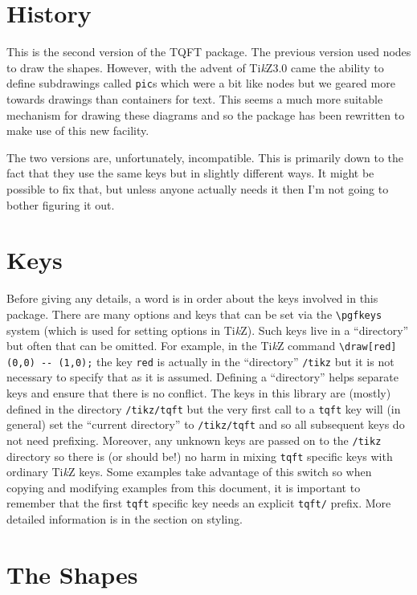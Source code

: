 \documentclass{ltxdoc}
\begin{document}
\section{History}

This is the second version of the TQFT package.
The previous version used nodes to draw the shapes.
However, with the advent of Ti\emph{k}Z3.0 came the ability to define subdrawings called \Verb+pic+s which were a bit like nodes but we geared more towards drawings than containers for text.
This seems a much more suitable mechanism for drawing these diagrams and so the package has been rewritten to make use of this new facility.

The two versions are, unfortunately, incompatible.
This is primarily down to the fact that they use the same keys but in slightly different ways.
It might be possible to fix that, but unless anyone actually needs it then I'm not going to bother figuring it out.


\section{Keys}

Before giving any details, a word is in order about the keys involved in this package.
There are many options and keys that can be set via the \Verb+\pgfkeys+ system (which is used for setting options in Ti\emph{k}Z).
Such keys live in a ``directory'' but often that can be omitted.
For example, in the Ti\emph{k}Z command \Verb+\draw[red] (0,0) -- (1,0);+ the key \Verb+red+ is actually in the ``directory'' \Verb+/tikz+ but it is not necessary to specify that as it is assumed.
Defining a ``directory'' helps separate keys and ensure that there is no conflict.
The keys in this library are (mostly) defined in the directory \Verb+/tikz/tqft+ but the very first call to a \Verb+tqft+ key will (in general) set the ``current directory'' to \Verb+/tikz/tqft+ and so all subsequent keys do not need prefixing.
Moreover, any unknown keys are passed on to the \Verb+/tikz+ directory so there is (or should be!) no harm in mixing \Verb+tqft+ specific keys with ordinary Ti\emph{k}Z keys.
Some examples take advantage of this switch so when copying and modifying examples from this document, it is important to remember that the first \Verb+tqft+ specific key needs an explicit \Verb+tqft/+ prefix.
More detailed information is in the section on styling.

\section{The Shapes}
\end{document}
